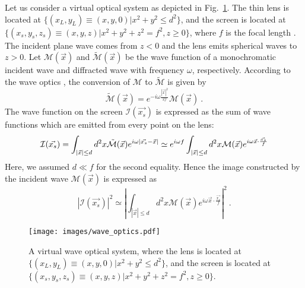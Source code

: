 \documentclass[a4paper,11pt]{article}
\begin{document}
    Let us consider a virtual optical system as depicted in Fig.~\ref{fig:wave_optics}. The thin lens is located at $\{(x_L,y_L)\equiv(x,y,0)|x^2+y^2\leq d^2\}$, and the screen is located at $\{(x_s,y_s,z_s)\equiv(x,y,z)|x^2+y^2+z^2=f^2, z\geq0\}$, where $f$ is the focal length \cite{Nambu2013,Kanai2013,Nambu2016}.
    The incident plane wave comes from $z<0$ and the lens emits spherical waves to $z>0$. Let $\mathcal{M}(\vec{x})$ and $\tilde{\mathcal{M}}(\vec{x})$ be the wave function of a monochromatic incident wave and diffracted wave with frequency $\omega$, respectively. According to the wave optics \cite{hecht2012optics}, the conversion of $\mathcal{M}$ to $\tilde{\mathcal{M}}$ is given by 
    \begin{equation}
        \tilde{\mathcal{M}}(\vec{x})=e^{-i \omega \frac{|\vec{x}|^2}{2 f}}\mathcal{M}(\vec{x})\ .
    \end{equation}
   The wave function on the screen $\mathcal{I}(\vec{x_s})$ is expressed as the sum of wave functions which are emitted from every point on the lens:
    \begin{equation}
        \mathcal{I}(\vec{x_s})
        =
        \int_{|\vec{x}| \leq d} d^2 x \tilde{\mathcal{M}}(\vec{x}) e^{i \omega |\vec{x_s}-\vec{x}|}\\
        \simeq
        e^{i \omega f}
        \int_{|\vec{x}| \leq d} d^2 x \mathcal{M} (\vec{x}) e^{i \omega \vec{x}\cdot\frac{\vec{x_s}}{f}}
    \end{equation}
    Here, we assumed $d \ll f$ for the second equality.
    Hence the image constructed by the incident wave $\mathcal{M}(\vec{x})$ is expressed as
    \begin{equation}
        \label{eq:lens_formula}
        |\mathcal{I}(\vec{x_s})|^2
        \simeq
        \left|
        \int_{|\vec{x}| \leq d} d^2 x \mathcal{M} (\vec{x}) e^{i \omega \vec{x}\cdot\frac{\vec{x_s}}{f}}
        \right|^2\ .
    \end{equation}
    \begin{figure}[ht]
        \centering
        \texttt{[image: images/wave\_optics.pdf]}
        \caption{A virtual wave optical system, where the lens is located at $\{(x_L,y_L)\equiv(x,y,0)|x^2+y^2\leq d^2\}$, and the screen is located at $\{(x_s,y_s,z_s)\equiv(x,y,z)|x^2+y^2+z^2=f^2, z\geq0\}$.}
        \label{fig:wave_optics}
    \end{figure}
\end{document}
